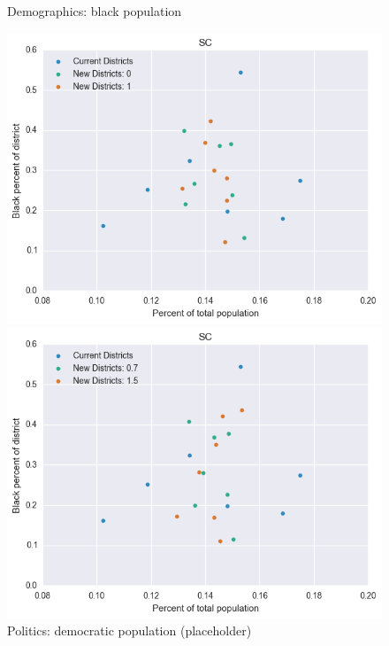 \begin{figure}[htb!] \centering
\caption{ Demographics: black population }
\includegraphics[width=4.5in]{../analysis/SC/analysis_scatter.png}
\caption{ Politics: democratic population (placeholder)}
\includegraphics[width=4.5in]{../analysis/SC/analysis_scatter2.png}
\end{figure}

\clearpage
\newpage

